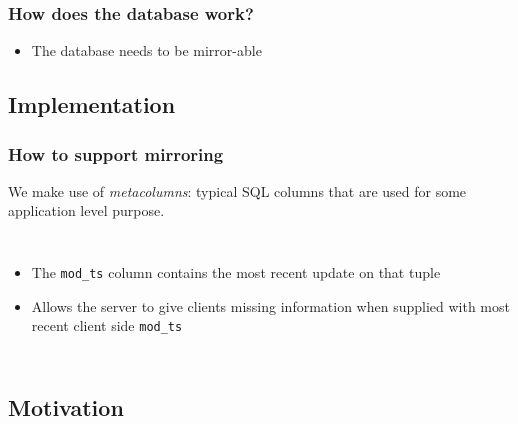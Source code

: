 \documentclass[]{beamer}
\begin{document}
\begin{frame}
\frametitle{How does the database work?}


\begin{itemize}
\item The database needs to be mirror-able
\end{itemize}


\end{frame}



\subsection{Implementation}

\begin{frame}
\frametitle{How to support mirroring}
We make use of \textit{metacolumns}: typical SQL columns that are used for some application level purpose.

\begin{columns}[c]
\column{2in}
\column{2in}
\small
\begin{itemize}
\item The \texttt{mod\_ts} column contains the most recent update on that tuple
\item Allows the server to give clients missing information when supplied with most recent client side \texttt{mod\_ts}
\end{itemize}
\end{columns}
\end{frame}



\subsection{Motivation}
\end{document}

